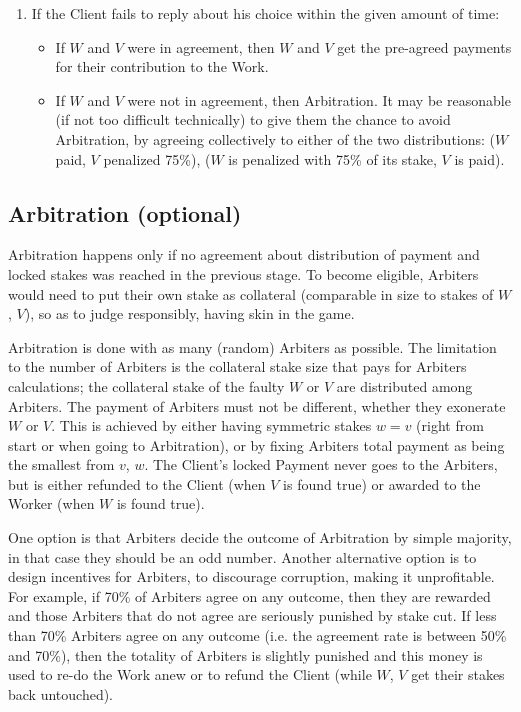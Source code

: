 \documentclass[conference]{IEEEtran}
\begin{document}
\begin{enumerate}
    \item If the Client fails to reply about his choice within the given amount of time: 
        \begin{itemize}
            \item If $W$ and $V$ were in agreement, then $W$ and $V$ get the pre-agreed payments for their contribution to the Work.
            
            \item If $W$ and $V$ were not in agreement, then Arbitration. It may be reasonable (if not too difficult technically) to give them the chance to avoid Arbitration, by agreeing collectively to either of the two distributions: ($W$ paid, $V$ penalized 75\%), ($W$ is penalized with 75\% of its stake, $V$ is paid).
        \end{itemize}
\end{enumerate}

\subsection{Arbitration (optional)}
\label{arbitration}

Arbitration happens only if no agreement about distribution of payment and locked stakes was reached in the previous stage. To become eligible, Arbiters would need to put their own stake as collateral (comparable in size to stakes of $W$, $V$), so as to judge responsibly, having skin in the game.

Arbitration is done with as many (random) Arbiters as possible. The limitation to the number of Arbiters is the collateral stake size that pays for Arbiters calculations; the collateral stake of the faulty $W$ or $V$ are distributed among Arbiters. The payment of Arbiters must not be different, whether they exonerate $W$ or $V$. This is achieved by either having symmetric stakes $w=v$ (right from start or when going to Arbitration), or by fixing Arbiters total payment as being the smallest from $v$, $w$. The Client's locked Payment never goes to the Arbiters, but is either refunded to the Client (when $V$ is found true) or awarded to the Worker (when $W$ is found true). 

One option is that Arbiters decide the outcome of Arbitration by simple majority, in that case they should be an odd number. Another alternative option is to design incentives for Arbiters, to discourage corruption, making it unprofitable. For example, if 70\% of Arbiters agree on any outcome, then they are rewarded and those Arbiters that do not agree are seriously punished by stake cut. If less than 70\% Arbiters agree on any outcome (i.e. the agreement rate is between 50\% and 70\%), then the totality of Arbiters is slightly punished and this money is used to re-do the Work anew or to refund the Client (while $W$, $V$ get their stakes back untouched).
\end{document}
